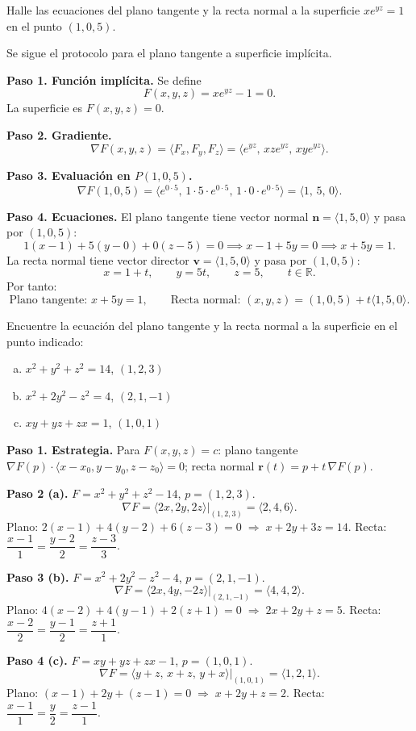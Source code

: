 \begin{example}
Halle las ecuaciones del plano tangente y la recta normal a la superficie
$x e^{yz} = 1$ en el punto $(1,0,5)$.
\begin{myproof}
Se sigue el protocolo para el plano tangente a superficie implícita.

\textbf{Paso 1. Función implícita.} Se define
\[
F(x,y,z) = x e^{yz} - 1 = 0.
\]
La superficie es $F(x,y,z)=0$.

\textbf{Paso 2. Gradiente.}
\[
\nabla F(x,y,z)
= \langle F_x, F_y, F_z \rangle
= \langle e^{yz},\, xz e^{yz},\, xy e^{yz} \rangle.
\]

\textbf{Paso 3. Evaluación en $P(1,0,5)$.}
\[
\nabla F(1,0,5)
= \langle e^{0\cdot 5},\, 1\cdot 5\cdot e^{0\cdot 5},\,
  1\cdot 0\cdot e^{0\cdot 5} \rangle
= \langle 1,\, 5,\, 0 \rangle.
\]

\textbf{Paso 4. Ecuaciones.}
El plano tangente tiene vector normal $\mathbf{n} = \langle 1,5,0 \rangle$
y pasa por $(1,0,5)$:
\[
1(x-1) + 5(y-0) + 0(z-5) = 0
\implies x - 1 + 5y = 0
\implies x + 5y = 1.
\]
La recta normal tiene vector director $\mathbf{v} = \langle 1,5,0 \rangle$
y pasa por $(1,0,5)$:
\[
x = 1 + t,\qquad y = 5t,\qquad z = 5,\qquad t\in\mathbb{R}.
\]
Por tanto:
\[
\boxed{\text{Plano tangente: } x + 5y = 1,\qquad
\text{Recta normal: } (x,y,z) = (1,0,5) + t\langle 1,5,0 \rangle}.
\]
\end{myproof}
\end{example}

\begin{prob}
Encuentre la ecuación del plano tangente y la recta normal a la
superficie en el punto indicado:
\begin{enumerate}[a)]
    \item $x^2 + y^2 + z^2 = 14$, $(1,2,3)$
    \item $x^2 + 2y^2 - z^2 = 4$, $(2,1,-1)$
    \item $xy + yz + zx = 1$, $(1,0,1)$
\end{enumerate}
\begin{myproof}
\textbf{Paso 1. Estrategia.}
Para $F(x,y,z)=c$: plano tangente $\nabla F(p)\cdot\langle x-x_0,y-y_0,z-z_0\rangle=0$; recta normal $\mathbf{r}(t)=p+t\,\nabla F(p)$.

\textbf{Paso 2 (a).} $F=x^2+y^2+z^2-14$, $p=(1,2,3)$.
\[
\nabla F=\langle 2x,2y,2z\rangle\big|_{(1,2,3)}=\langle 2,4,6\rangle.
\]
Plano: $2(x-1)+4(y-2)+6(z-3)=0\;\Rightarrow\;\boxed{x+2y+3z=14}$.
Recta: $\dfrac{x-1}{1}=\dfrac{y-2}{2}=\dfrac{z-3}{3}$.

\textbf{Paso 3 (b).} $F=x^2+2y^2-z^2-4$, $p=(2,1,-1)$.
\[
\nabla F=\langle 2x,4y,-2z\rangle\big|_{(2,1,-1)}=\langle 4,4,2\rangle.
\]
Plano: $4(x-2)+4(y-1)+2(z+1)=0\;\Rightarrow\;\boxed{2x+2y+z=5}$.
Recta: $\dfrac{x-2}{2}=\dfrac{y-1}{2}=\dfrac{z+1}{1}$.

\textbf{Paso 4 (c).} $F=xy+yz+zx-1$, $p=(1,0,1)$.
\[
\nabla F=\langle y+z,\,x+z,\,y+x\rangle\big|_{(1,0,1)}=\langle 1,2,1\rangle.
\]
Plano: $(x-1)+2y+(z-1)=0\;\Rightarrow\;\boxed{x+2y+z=2}$.
Recta: $\dfrac{x-1}{1}=\dfrac{y}{2}=\dfrac{z-1}{1}$.
\end{myproof}
\end{prob}

